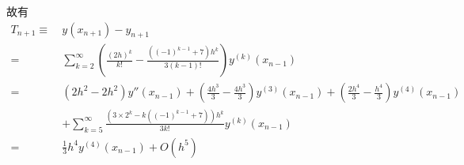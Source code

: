 \documentclass[11pt]{article}
\begin{document}
\begin{question}
{        %
        故有
        \begin{align*}
            T_{n + 1} \equiv\  & y(x_{n + 1}) - y_{n + 1}                                                                                                                                                \\
            =\                 & \sum_{k = 2}^{\infty}\left(\frac{(2h)^k}{k!} - \frac{\left((-1)^{k - 1} + 7\right)h^k}{3(k - 1)!}\right)y^{(k)}(x_{n - 1})                                              \\
            =\                 & \left(2h^2 - 2h^2\right)y''(x_{n - 1}) + \left(\frac{4h^3}{3} - \frac{4h^3}{3}\right)y^{(3)}(x_{n - 1}) + \left(\frac{2h^4}{3} - \frac{h^4}{3}\right)y^{(4)}(x_{n - 1}) \\
                               & + \sum_{k = 5}^{\infty}\frac{\left(3 \times 2^k - k\left((-1)^{k - 1} + 7\right)\right)h^k}{3k!}y^{(k)}(x_{n - 1})                                                      \\
            =\                 & \frac{1}{3}h^4y^{(4)}(x_{n - 1}) + O(h^5)
        \end{align*}
    }
\end{question}
\end{document}

